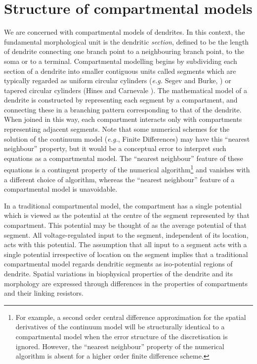 \section{Structure of compartmental models}
We are concerned with compartmental models of dendrites. In this
context, the fundamental morphological unit is the dendritic
\emph{section}, defined to be the length of dendrite connecting
one branch point to a neighbouring branch point, to the soma or to
a terminal. Compartmental modelling begins by subdividing each
section of a dendrite into smaller contiguous units called
segments which are typically regarded as uniform circular
cylinders (\emph{e.g.} Segev and Burke, \cite{Segev98}) or tapered
circular cylinders (Hines and Carnevale \cite{Hines97}). The
mathematical model of a dendrite is constructed by representing
each segment by a compartment, and connecting these in a branching
pattern corresponding to that of the dendrite. When joined in this
way, each compartment interacts only with compartments
representing adjacent segments. Note that some numerical schemes
for the solution of the continuum model (\emph{e.g.}, Finite
Differences) may have this ``nearest neighbour'' property, but it
would be a conceptual error to interpret such equations as a
compartmental model. The ``nearest neighbour'' feature of these
equations is a contingent property of the numerical
algorithm\footnote{For example, a second order central difference
approximation for the spatial derivatives of the continuum model
will be structurally identical to a compartmental model when the
error structure of the discretisation is ignored. However, the
``nearest neighbour'' property of the numerical algorithm is
absent for a higher order finite difference scheme.} and vanishes
with a different choice of algorithm, whereas the ``nearest
neighbour'' feature of a compartmental model is unavoidable.

In a traditional compartmental model, the compartment has a single
potential which is viewed as the potential at the centre of the
segment represented by that compartment. This potential may be
thought of as the average potential of that segment. All
voltage-regulated input to the segment, independent of its
location, acts with this potential. The assumption that all input
to a segment acts with a single potential irrespective of location
on the segment implies that a traditional compartmental model
regards dendritic segments as iso-potential regions of dendrite.
Spatial variations in biophysical properties of the dendrite and
its morphology are expressed through differences in the properties
of compartments and their linking resistors.

